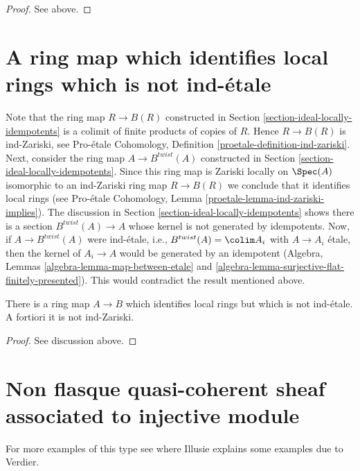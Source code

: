 \begin{proof}
See above.
\end{proof}



\section{A ring map which identifies local rings which is not ind-\'etale}
\label{section-not-ind-etale}

\noindent
Note that the ring map $R \to B(R)$ constructed in
Section \ref{section-ideal-locally-idempotents} is
a colimit of finite products of copies of $R$. Hence $R \to B(R)$
is ind-Zariski, see
Pro-\'etale Cohomology, Definition \ref{proetale-definition-ind-zariski}.
Next, consider the ring map $A \to B^{twist}(A)$
constructed in Section \ref{section-ideal-locally-idempotents}.
Since this ring map is Zariski locally on $\Spec(A)$ isomorphic to an
ind-Zariski ring map $R \to B(R)$ we conclude that it identifies local rings
(see Pro-\'etale Cohomology, Lemma \ref{proetale-lemma-ind-zariski-implies}).
The discussion in Section \ref{section-ideal-locally-idempotents}
shows there is a section
$B^{twist}(A) \to A$ whose kernel is not generated by idempotents.
Now, if $A \to B^{twist}(A)$ were ind-\'etale, i.e.,
$B^{twist}(A) = \colim A_i$ with $A \to A_i$ \'etale,
then the kernel of $A_i \to A$ would be generated by an idempotent
(Algebra, Lemmas \ref{algebra-lemma-map-between-etale} and
\ref{algebra-lemma-surjective-flat-finitely-presented}).
This would contradict the result mentioned above.

\begin{lemma}
\label{lemma-not-ind-etale}
There is a ring map $A \to B$ which identifies local rings but
which is not ind-\'etale. A fortiori it is not ind-Zariski.
\end{lemma}

\begin{proof}
See discussion above.
\end{proof}




\section{Non flasque quasi-coherent sheaf associated to injective module}
\label{section-nonflasque}

\noindent
For more examples of this type see \cite[Expos\'e II, Appendix I]{SGA6}
where Illusie explains some examples due to Verdier.

